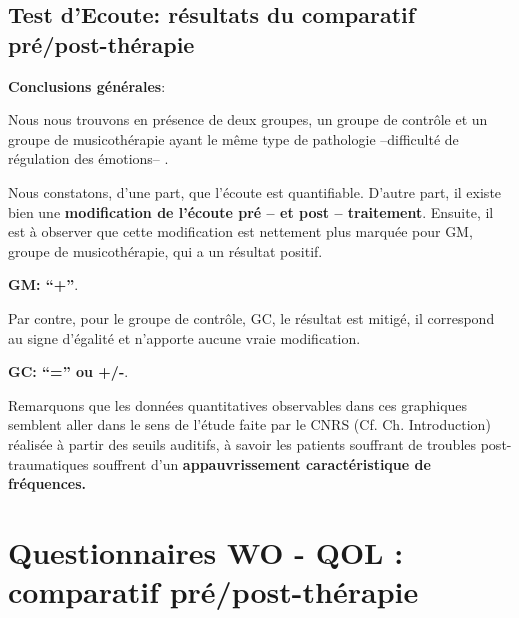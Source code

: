 \subsection{Test d'Ecoute: résultats du comparatif pré/post-thérapie}

\textbf{Conclusions générales}:

             Nous nous trouvons
           en présence de deux groupes, un groupe de contrôle et un
           groupe de musicothérapie ayant le même type de
           pathologie --difficulté de régulation des émotions-- .


Nous constatons, d'une part, que l'écoute est quantifiable.
           D'autre part, il existe bien
          une \textbf{modification de l'écoute pré -- et post -- traitement}.
Ensuite, il est à observer que
          cette modification est nettement plus marquée
          pour GM, groupe de musicothérapie, qui a un résultat positif.


          \textbf{GM: ``+''}.


Par contre,  pour le groupe de contrôle, GC, le résultat est mitigé, il correspond au signe d'égalité et n'apporte aucune vraie modification.

          \textbf{GC:  ``='' ou +/-}.


        Remarquons que les données quantitatives observables dans ces graphiques semblent aller dans le
sens de  l'étude faite par le
CNRS (Cf. Ch. Introduction) \autocite{affectiveDisorders} réalisée à partir des seuils auditifs, à savoir
les patients souffrant de troubles post-traumatiques souffrent d'un
\textbf{appauvrissement caractéristique de fréquences.}

\section{Questionnaires WO - QOL : comparatif pré/post-thérapie }


